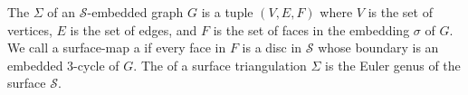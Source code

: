 The  $\Sigma$ of an $\mathcal{S}$-embedded graph $G$ is a tuple $(V, E, F)$ where $V$ is the set of vertices, $E$ is the set of edges, and $F$ is the set of faces in the embedding $\sigma$ of $G$. We call a surface-map a  if every face in $F$ is a disc in $\mathcal{S}$ whose boundary is an embedded $3$-cycle of $G$.  The  of a surface triangulation $\Sigma$ is the Euler genus of the surface $\mathcal{S}$.



